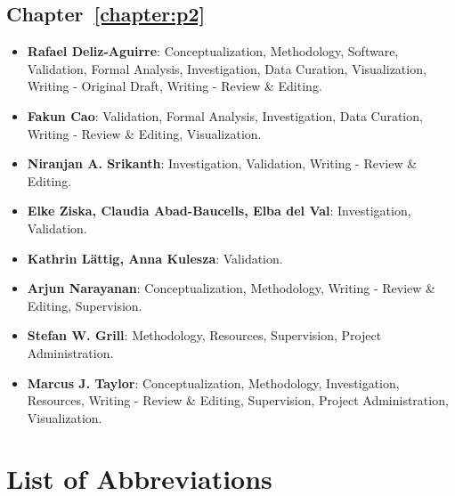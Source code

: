 \section*{Chapter~\ref{chapter:p2}}
\begin{itemize}

\item \textbf{Rafael Deliz-Aguirre}: Conceptualization, Methodology, Software, Validation, Formal Analysis, Investigation, Data Curation, Visualization, Writing - Original Draft, Writing - Review \& Editing.

\item \textbf{Fakun Cao}: Validation, Formal Analysis, Investigation, Data Curation, Writing - Review \& Editing, Visualization.

\item \textbf{Niranjan A. Srikanth}: Investigation, Validation, Writing - Review \& Editing.

\item \textbf{Elke Ziska, Claudia Abad-Baucells, Elba del Val}: Investigation, Validation.

\item \textbf{Kathrin Lättig, Anna Kulesza}: Validation.

\item \textbf{Arjun Narayanan}: Conceptualization, Methodology, Writing - Review \& Editing, Supervision.

\item \textbf{Stefan W. Grill}: Methodology, Resources, Supervision, Project Administration.

\item \textbf{Marcus J. Taylor}: Conceptualization, Methodology, Investigation, Resources, Writing - Review \& Editing, Supervision, Project Administration, Visualization.

\end{itemize}

\cleardoublepage
{}
\chapter*{List of Abbreviations}


\restoregeometry

\pagestyle{plain}

\mainmatter

\pagestyle{fancy}
\renewcommand{\headrulewidth}{0pt} %

